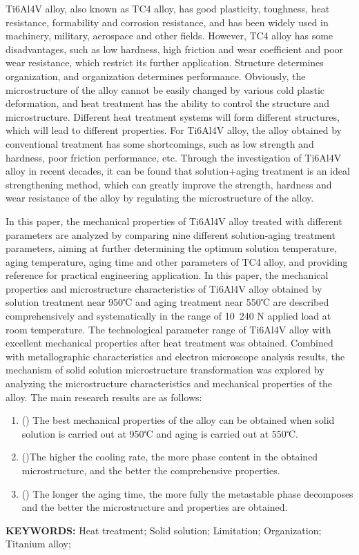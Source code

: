 \documentclass[
class = book,
zihao = -4,
font = noto,
paper = a4paper,
openany
]{easybook}
\begin{document}
\begin{enabstract}
	{\rmfamily
	Ti6Al4V alloy, also known as TC4 alloy, has good plasticity, toughness, heat resistance, formability and corrosion resistance, and has been widely used in machinery, military, aerospace and other fields. However, TC4 alloy has some disadvantages, such as low hardness, high friction and wear coefficient and poor wear resistance, which restrict its further application. Structure determines organization, and organization determines performance. Obviously, the microstructure of the alloy cannot be easily changed by various cold plastic deformation, and heat treatment has the ability to control the structure and microstructure. Different heat treatment systems will form different structures, which will lead to different properties. For Ti6Al4V alloy, the alloy obtained by conventional treatment has some shortcomings, such as low strength and hardness, poor friction performance, etc. Through the investigation of Ti6Al4V alloy in recent decades, it can be found that solution+aging treatment is an ideal strengthening method, which can greatly improve the strength, hardness and wear resistance of the alloy by regulating the microstructure of the alloy.

	In this paper, the mechanical properties of Ti6Al4V alloy treated with different parameters are analyzed by comparing nine different solution-aging treatment parameters, aiming at further determining the optimum solution temperature, aging temperature, aging time and other parameters of TC4 alloy, and providing reference for practical engineering application. In this paper, the mechanical properties and microstructure characteristics of Ti6Al4V alloy obtained by solution treatment near 950℃ and aging treatment near 550℃ are described comprehensively and systematically in the range of 10~240 N applied load at room temperature. The technological parameter range of Ti6Al4V alloy with excellent mechanical properties after heat treatment was obtained. Combined with metallographic characteristics and electron microscope analysis results, the mechanism of solid solution microstructure transformation was explored by analyzing the microstructure characteristics and mechanical properties of the alloy. The main research results are as follows:
	\begin{enumerate}
		\item () The best mechanical properties of the alloy can be obtained when solid solution is carried out at 950℃ and aging is carried out at 550℃.
		\item  ()The higher the cooling rate, the more phase content in the obtained microstructure, and the better the comprehensive properties.
		\item () The longer the aging time, the more fully the metastable phase decomposes and the better the microstructure and properties are obtained.
	\end{enumerate}
\par\textbf{KEYWORDS: } Heat treatment; Solid solution; Limitation; Organization; Titanium alloy; }
\end{enabstract}
\end{document}
